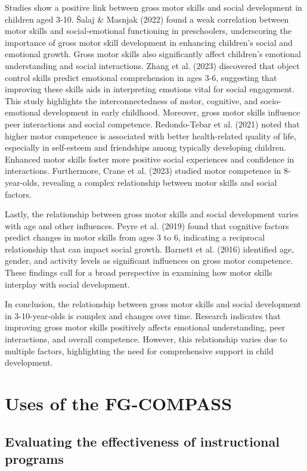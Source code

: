 \documentclass[
  letterpaper,
  DIV=11,
  numbers=noendperiod]{scrreprt}
\begin{document}
Studies show a positive link between gross motor skills and social
development in children aged 3-10. Šalaj \& Masnjak (2022) found a weak
correlation between motor skills and social-emotional functioning in
preschoolers, underscoring the importance of gross motor skill
development in enhancing children's social and emotional growth. Gross
motor skills also significantly affect children's emotional
understanding and social interactions. Zhang et al. (2023) discovered
that object control skills predict emotional comprehension in ages 3-6,
suggesting that improving these skills aids in interpreting emotions
vital for social engagement. This study highlights the
interconnectedness of motor, cognitive, and socio-emotional development
in early childhood. Moreover, gross motor skills influence peer
interactions and social competence. Redondo-Tebar et al. (2021) noted
that higher motor competence is associated with better health-related
quality of life, especially in self-esteem and friendships among
typically developing children. Enhanced motor skills foster more
positive social experiences and confidence in interactions. Furthermore,
Crane et al. (2023) studied motor competence in 8-year-olds, revealing a
complex relationship between motor skills and social factors.

Lastly, the relationship between gross motor skills and social
development varies with age and other influences. Peyre et al. (2019)
found that cognitive factors predict changes in motor skills from ages 3
to 6, indicating a reciprocal relationship that can impact social
growth. Barnett et al. (2016) identified age, gender, and activity
levels as significant influences on gross motor competence. These
findings call for a broad perspective in examining how motor skills
interplay with social development.

In conclusion, the relationship between gross motor skills and social
development in 3-10-year-olds is complex and changes over time. Research
indicates that improving gross motor skills positively affects emotional
understanding, peer interactions, and overall competence. However, this
relationship varies due to multiple factors, highlighting the need for
comprehensive support in child development.

\section{Uses of the FG-COMPASS}\label{uses-of-the-fg-compass}

\subsection{Evaluating the effectiveness of instructional
programs}\label{evaluating-the-effectiveness-of-instructional-programs}
\end{document}
